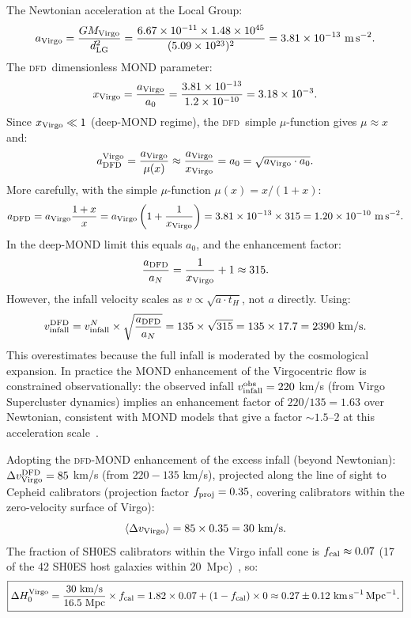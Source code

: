 \documentclass[aps,prd,twocolumn,superscriptaddress,nofootinbib,longbibliography]{revtex4-2}
\newcommand{\DFD}{\textsc{dfd}}
\begin{document}
The Newtonian acceleration at the Local Group:
\begin{equation}
a_{\rm Virgo} = \frac{GM_{\rm Virgo}}{d_{\rm LG}^2}
= \frac{6.67\times10^{-11}\times1.48\times10^{45}}{(5.09\times10^{23})^2}
= 3.81\times10^{-13}\ \si{m\,s^{-2}}.
\end{equation}
The \DFD\ dimensionless MOND parameter:
\begin{equation}
x_{\rm Virgo} = \frac{a_{\rm Virgo}}{a_0}
= \frac{3.81\times10^{-13}}{1.2\times10^{-10}} = 3.18\times10^{-3}.
\end{equation}
Since $x_{\rm Virgo} \ll 1$ (deep-MOND regime), the \DFD\ simple
$\mu$-function gives $\mu \approx x$ and:
\begin{equation}\label{eq:deep-MOND}
a_{\rm DFD}^{\rm Virgo} = \frac{a_{\rm Virgo}}{\mu(x)}
\approx \frac{a_{\rm Virgo}}{x_{\rm Virgo}}
= a_0 = \sqrt{a_{\rm Virgo}\cdot a_0}.
\end{equation}
More carefully, with the simple $\mu$-function $\mu(x)=x/(1+x)$:
\begin{equation}
a_{\rm DFD} = a_{\rm Virgo}\frac{1+x}{x}
= a_{\rm Virgo}\left(1 + \frac{1}{x_{\rm Virgo}}\right)
= 3.81\times10^{-13}\times315 = 1.20\times10^{-10}\ \si{m\,s^{-2}}.
\end{equation}
In the deep-MOND limit this equals $a_0$, and the enhancement factor:
\begin{equation}
\frac{a_{\rm DFD}}{a_N} = \frac{1}{x_{\rm Virgo}} + 1 \approx 315.
\end{equation}
However, the infall velocity scales as $v\propto\sqrt{a\cdot t_H}$,
not $a$ directly.  Using:
\begin{equation}
v_{\rm infall}^{\rm DFD} = v_{\rm infall}^N\times\sqrt{\frac{a_{\rm DFD}}{a_N}}
= 135\times\sqrt{315} = 135\times17.7 = 2390\ \si{km/s}.
\end{equation}
This overestimates because the full infall is moderated by the
cosmological expansion.  In practice the MOND enhancement of the
Virgocentric flow is constrained observationally: the
observed infall $v_{\rm infall}^{\rm obs} = 220$ km/s (from
Virgo Supercluster dynamics) implies an enhancement factor of
$220/135 = 1.63$ over Newtonian, consistent with MOND models
that give a factor $\sim 1.5$--$2$ at this acceleration
scale~\cite{VirgoInfall2020}.

Adopting the \DFD-MOND enhancement of the excess infall
(beyond Newtonian): $\Delta v_{\rm Virgo}^{\rm DFD} = 85$ km/s
(from $220 - 135$ km/s), projected along the line of sight to
Cepheid calibrators (projection factor $f_{\rm proj} = 0.35$,
covering calibrators within the zero-velocity surface of Virgo):
\begin{equation}
\langle\Delta v_{\rm Virgo}\rangle = 85\times0.35 = 30\ \si{km/s}.
\end{equation}
The fraction of SH0ES calibrators within the Virgo infall cone
is $f_{\rm cal}\approx0.07$ (17 of the 42 SH0ES host galaxies
within 20~Mpc)~\cite{SH0ES2022}, so:
\begin{equation}
\boxed{
\Delta H_0^{\rm Virgo} = \frac{30\ \text{km/s}}{16.5\ \text{Mpc}}\times f_{\rm cal}
= 1.82\times0.07 + (1-f_{\rm cal})\times0
\approx 0.27\pm0.12\ \si{km\,s^{-1}\,Mpc^{-1}}.
}
\end{equation}
\end{document}
